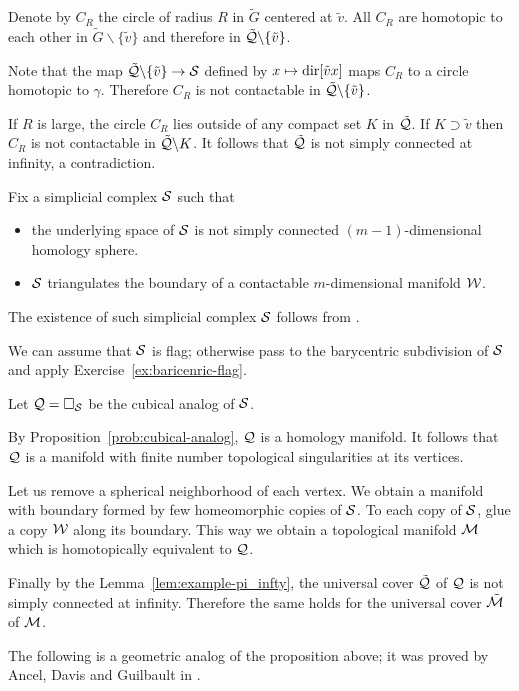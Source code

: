 Denote by $C_R$ the circle of radius $R$ in $\tilde G$ centered at $\tilde v$.
All $C_R$ are homotopic to each other in $\tilde G\backslash\{\tilde v\}$ and therefore in $\tilde{\mathcal{Q}}\backslash \{\tilde v\}$.

Note that the map $\tilde{\spc{Q}}\backslash \{\tilde v\}\to \spc{S}$
defined by $x\mapsto\dir{\tilde v}{x}$ maps $C_R$ to a circle homotopic to $\gamma$.
Therefore $C_R$ is not contactable in $\tilde{\mathcal{Q}}\backslash \{\tilde v\}$.


If $R$ is large, 
the circle $C_R$  
lies outside of any compact set $K$ in $\tilde{\mathcal{Q}}$.
If $K\supset \tilde v$ then $C_R$ is not contactable in $\tilde{\mathcal{Q}}\backslash K$.
It follows that $\tilde{\mathcal{Q}}$ is not simply connected at infinity, a contradiction.
\qeds

Fix a simplicial complex $\mathcal{S}$ such that
\begin{itemize}
\item the underlying space of $\mathcal{S}$ is not simply connected $(m-1)$-dimensional homology sphere.
\item $\mathcal{S}$ triangulates the boundary of a contactable $m$-dimensional manifold $\mathcal{W}$. 
\end{itemize}
The existence of such simplicial complex $\mathcal{S}$ follows from \cite{kervaire}.

We can assume that $\mathcal{S}$ is flag; 
otherwise pass to the barycentric subdivision of $\mathcal{S}$ and apply Exercise~\ref{ex:baricenric-flag}.


Let $\mathcal{Q}=\square_{\mathcal{S}}$ be the cubical analog of $\mathcal{S}$.

By Proposition~\ref{prob:cubical-analog},
$\mathcal{Q}$ is a homology manifold.
It follows that $\mathcal{Q}$ is a manifold with finite number topological singularities at its vertices.


Let us remove a spherical neighborhood of each vertex.
We obtain a manifold with boundary formed by few homeomorphic copies of $\mathcal{S}$.
To each copy of $\mathcal{S}$, 
glue a copy $\mathcal{W}$ along its boundary.
This way we obtain a topological manifold $\mathcal{M}$ which is homotopically equivalent to $\mathcal{Q}$.

Finally by the Lemma~\ref{lem:example-pi_infty},  
the universal cover $\tilde{\mathcal{Q}}$ of $\mathcal{Q}$
is not simply connected at infinity.
Therefore the same holds for 
the universal cover $\tilde{\mathcal{M}}$ of $\mathcal{M}$.
\qeds

The following is a geometric analog of the proposition above;
it was proved by Ancel, Davis and Guilbault in \cite{ADG}. %


